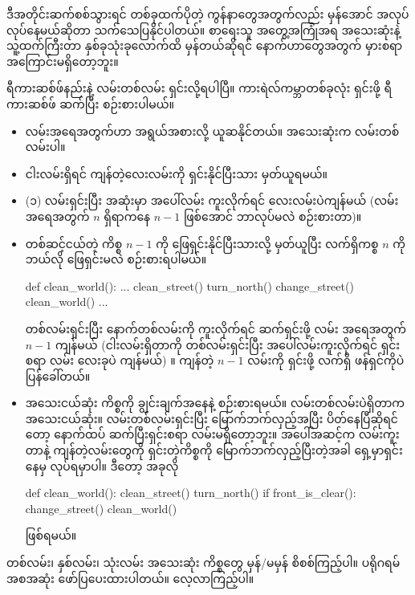 ဒီအတိုင်းဆက်စစ်သွားရင် တစ်ခုထက်ပိုတဲ့ ကွန်နာတွေအတွက်လည်း မှန်အောင် အလုပ်လုပ်နေမယ်ဆိုတာ သက်သေပြနိုင်ပါတယ်။ စာရေးသူ အတွေ့အကြုံအရ အသေးဆုံးနဲ့ သူ့ထက်ကြီးတာ နှစ်ခုသုံးခုလောက်ထိ မှန်တယ်ဆိုရင် နောက်ဟာတွေအတွက် မှားစရာ အကြောင်းမရှိတော့ဘူး။

ရီကားဆစ်ဖ်နည်းနဲ့ လမ်းတစ်လမ်း ရှင်းလို့ရပါပြီ။ ကားရဲလ်ကမ္ဘာတစ်ခုလုံး ရှင်းဖို့ ရီကားဆစ်ဖ် ဆက်ပြီး စဉ်းစားပါမယ်။ 
%
\begin{itemize}
    \item လမ်းအရေအတွက်ဟာ အရွယ်အစားလို့ ယူဆနိုင်တယ်။ အသေးဆုံးက လမ်းတစ်လမ်းပါ။
    \item ငါးလမ်းရှိရင် ကျန်တဲ့လေးလမ်းကို ရှင်းနိုင်ပြီးသား မှတ်ယူရမယ်။
    \item (၁) လမ်းရှင်းပြီး အဆုံးမှာ အပေါ်လမ်း ကူးလိုက်ရင် လေးလမ်းပဲကျန်မယ် (လမ်းအရေအတွက် $n$ ရှိရာကနေ   $n - 1$ ဖြစ်အောင် ဘာလုပ်မလဲ စဉ်းစားတာ)။
    \item တစ်ဆင့်ငယ်တဲ့ ကိစ္စ $n - 1$ ကို ဖြေရှင်းနိုင်ပြီးသားလို့ မှတ်ယူပြီး လက်ရှိကစ္စ $n$ ကို ဘယ်လို ဖြေရှင်းမလဲ စဉ်းစားရပါမယ်။
%
\begin{py}
def clean_world():
    ...
    clean_street()
    turn_north()
    change_street()
    clean_world()
    ...
\end{py}
    တစ်လမ်းရှင်းပြီး နောက်တစ်လမ်းကို ကူးလိုက်ရင် ဆက်ရှင်းဖို့ လမ်း အရေအတွက် $n - 1$ ကျန်မယ် (ငါးလမ်းရှိတာကို တစ်လမ်းရှင်းပြီး အပေါ်လမ်းကူးလိုက်ရင် ရှင်းစရာ လမ်း လေးခုပဲ ကျန်မယ်) ။ ကျန်တဲ့ $n - 1$  လမ်းကို ရှင်းဖို့ လက်ရှိ  ဖန်ရှင်ကိုပဲ ပြန်ခေါ်တယ်။
%
    \item အသေးငယ်ဆုံး ကိစ္စကို ချွင်းချက်အနေနဲ့ စဉ်းစားရမယ်။   လမ်းတစ်လမ်းပဲရှိတာက အသေးငယ်ဆုံး။ လမ်းတစ်လမ်းရှင်းပြီး မြောက်ဘက်လှည့်အပြီး ပိတ်နေပြီဆိုရင်တော့ နောက်ထပ် ဆက်ပြီးရှင်းစရာ လမ်းမရှိတော့ဘူး။ အပေါ်အဆင့်က လမ်းကူးတာနဲ့ ကျန်တဲ့လမ်းတွေကို ရှင်းတဲ့ကိစ္စကို မြောက်ဘက်လှည့်ပြီးတဲ့အခါ ရှေ့မှာရှင်းနေမှ လုပ်ရမှာပါ။ ဒီတော့ အခုလို 
%
\begin{py}
def clean_world():
    clean_street()
    turn_north()
    if front_is_clear():
        change_street()
        clean_world()
\end{py}
    ဖြစ်ရမယ်။ 
%
\end{itemize}
%
တစ်လမ်း၊ နှစ်လမ်း၊ သုံးလမ်း အသေးဆုံး ကိစ္စတွေ မှန်/မမှန် စိစစ်ကြည့်ပါ။ ပရိုဂရမ် အစအဆုံး ဖော်ပြပေးထားပါတယ်။ လေ့လာကြည့်ပါ။
%
